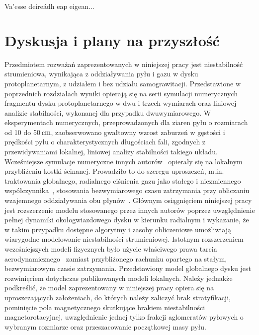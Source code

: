 \begin{savequote}[75mm]
   Va'esse deireádh eap eigean$\ldots$
\end{savequote}

\chapter{Dyskusja i plany na przyszłość}
Przedmiotem rozważań zaprezentowanych w niniejszej pracy jest niestabilność
strumieniowa, wynikająca z oddziaływania pyłu i gazu w dysku protoplanetarnym, z
udziałem i bez udziału samograwitacji. Przedstawione w poprzednich rozdziałach
wyniki opierają się na serii symulacji numerycznych fragmentu dysku
protoplanetarnego w dwu i trzech wymiarach oraz liniowej analizie stabilności,
wykonanej dla przypadku dwuwymiarowego.
%
%
W eksperymentach numerycznych, przeprowadzonych dla ziaren pyłu o rozmiarach od
10 do 50$\hbox{$\thinspace\textrm{cm}$}$, zaobserwowano gwałtowny wzrost zaburzeń w gęstości i prędkości
pyłu o charakterystycznych długościach fali, zgodnych z przewidywaniami lokalnej,
liniowej analizy stabilności takiego układu. Wcześniejsze symulacje numeryczne
innych autorów~\cite{YG05, JY07, TB09, BS10a, BS10b} opierały się na lokalnym
przybliżeniu kostki ścinanej. Prowadziło to do szeregu uproszczeń, m.in.
traktowania globalnego, radialnego ciśnienia gazu jako stałego i niezmiennego
współczynnika~\cite{N86}, stosowania bezwymiarowego czasu zatrzymania przy
obliczaniu wzajemnego oddziaływania obu płynów~\cite{YG05}. Głównym
osiągnięciem niniejszej pracy jest rozszerzenie modelu stosowanego przez innych
autorów poprzez uwzględnienie pełnej dynamiki okołogwiazdowego dysku w kierunku
radialnym i wykazanie, że w takim przypadku dostępne algorytmy i zasoby
obliczeniowe umożliwiają wiarygodne modelowanie niestabilności
strumieniowej. Istotnym rozszerzeniem wcześniejszych modeli fizycznych było 
użycie właściwego prawa tarcia aerodynamicznego~
zamiast przybliżonego rachunku opartego na stałym, bezwymiarowym czasie
zatrzymania. 
%
Przedstawiony model globalnego dysku jest rozwinięciem dotychczas
publikowanych modeli lokalnych. Należy jednakże podkreślić, że model zaprezentowany 
w niniejszej pracy opiera się na uproszczających założeniach, do których należy
zaliczyć brak stratyfikacji, pominięcie pola magnetycznego skutkujące
brakiem niestabilności magnetorotacyjnej, uwzględnienie jednej tylko frakcji
aglomeratów pyłowych o wybranym rozmiarze oraz przeszacowanie początkowej masy
pyłu.
%

